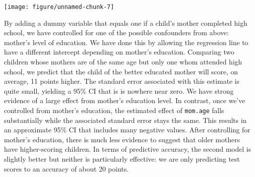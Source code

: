 \documentclass[addpoints,12pt]{exam}\usepackage[]{graphicx}\usepackage[]{color}
\makeatletter
\def\maxwidth{ %
  \ifdim\Gin@nat@width>\linewidth
    \linewidth
  \else
    \Gin@nat@width
  \fi
}
\newenvironment{knitrout}{}{} %
\makeatother
\begin{document}
\begin{questions}
\begin{parts}
\begin{solution}
\begin{knitrout}
{\centering \texttt{[image: figure/unnamed-chunk-7]} 

}



\end{knitrout}
By adding a dummy variable that equals one if a child's mother completed high school, we have controlled for one of the possible confounders from above: mother's level of education. We have done this by allowing the regression line to have a different intercept depending on mother's education. Comparing two children whose mothers are of the same age but only one whom attended high school, we predict that the child of the better educated mother will score, on average, 11 points higher. The standard error associated with this estimate is quite small, yielding a 95\% CI that is is nowhere near zero. We have strong evidence of a large effect from mother's education level. In contrast, once we've controlled from mother's education, the estimated effect of \texttt{mom.age} falls substantially while the associated standard error stays the same. This results in an approximate 95\% CI that includes many negative values. After controlling for mother's education, there is much less evidence to suggest that older mothers have higher-scoring children. In terms of predictive accuracy, the second model is slightly better but neither is particularly effective: we are only predicting test scores to an accuracy of about 20 points.
    \end{solution}

\end{parts}
\end{questions}
\end{document}
